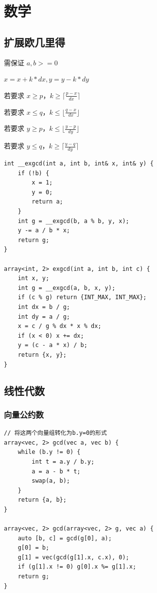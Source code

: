 \documentclass[UTF8, twoside]{ctexart}
\begin{document}
\begin{sloppypar}
\clearpage

\section{数学}

\subsection{扩展欧几里得}

需保证 $a,b>=0$

$x=x+k*dx,y=y-k*dy$

若要求 $x\ge p$，$k\ge\lceil \frac{p-x}{dx}\rceil$

若要求 $x\le q$，$k\le\lfloor \frac{q-x}{dx}\rfloor$

若要求 $y\ge p$，$k\le\lfloor \frac{y-p}{dy}\rfloor$

若要求 $y\le q$，$k\ge\lceil \frac{y-q}{dy}\rceil$

\begin{lstlisting}[style=cpp]
int __exgcd(int a, int b, int& x, int& y) {
    if (!b) {
        x = 1;
        y = 0;
        return a;
    }
    int g = __exgcd(b, a % b, y, x);
    y -= a / b * x;
    return g;
}

array<int, 2> exgcd(int a, int b, int c) {
    int x, y;
    int g = __exgcd(a, b, x, y);
    if (c % g) return {INT_MAX, INT_MAX};
    int dx = b / g;
    int dy = a / g;
    x = c / g % dx * x % dx;
    if (x < 0) x += dx;
    y = (c - a * x) / b;
    return {x, y};
}
\end{lstlisting}

\subsection{线性代数}

\subsubsection{向量公约数}

\begin{lstlisting}[style=cpp]
// 将这两个向量组转化为b.y=0的形式
array<vec, 2> gcd(vec a, vec b) {
    while (b.y != 0) {
        int t = a.y / b.y;
        a = a - b * t;
        swap(a, b);
    }
    return {a, b};
}

array<vec, 2> gcd(array<vec, 2> g, vec a) {
    auto [b, c] = gcd(g[0], a);
    g[0] = b;
    g[1] = vec(gcd(g[1].x, c.x), 0);
    if (g[1].x != 0) g[0].x %= g[1].x;
    return g;
}
\end{lstlisting}


\end{sloppypar}
\end{document}
